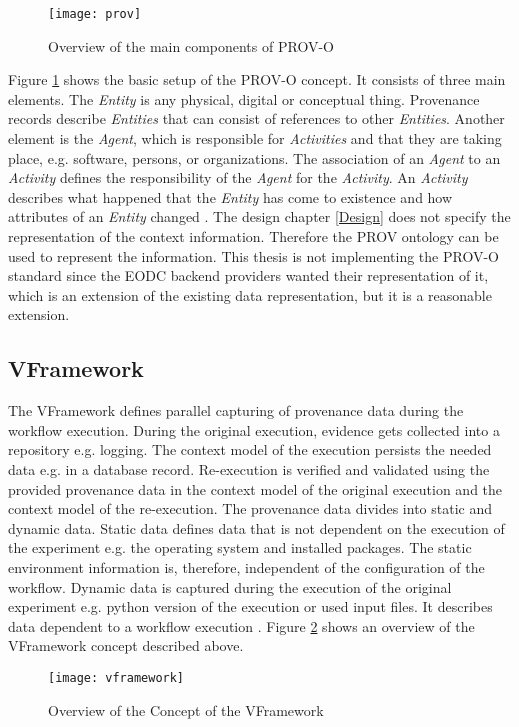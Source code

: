\documentclass[draft,final]{vutinfth} %
\begin{document}
\begin{figure}[h]
	\centering
	\texttt{[image: prov]}
	\caption{Overview of the main components of PROV-O \cite{733f89c65e4844f9aabcae1c276a5602}}
	\label{fig:prov} %
\end{figure}

Figure \ref{fig:prov} shows the basic setup of the PROV-O concept. It consists of three main elements. The \textit{Entity} is any physical, digital or conceptual thing. Provenance records describe \textit{Entities} that can consist of references to other \textit{Entities}. Another element is the \textit{Agent}, which is responsible for \textit{Activities} and that they are taking place, e.g. software, persons, or organizations. The association of an \textit{Agent} to an \textit{Activity} defines the responsibility of the \textit{Agent} for the \textit{Activity}. An \textit{Activity} describes what happened that the \textit{Entity} has come to existence and how attributes of an \textit{Entity} changed \cite{733f89c65e4844f9aabcae1c276a5602}. The design chapter \ref{Design} does not specify the representation of the context information. Therefore the PROV ontology can be used to represent the information. This thesis is not implementing the PROV-O standard since the EODC backend providers wanted their representation of it, which is an extension of the existing data representation, but it is a reasonable extension. 

\subsection{VFramework}\label{vframework}

The VFramework defines parallel capturing of provenance data during the workflow execution. During the original execution, evidence gets collected into a repository e.g. logging. The context model of the execution persists the needed data e.g. in a database record. Re-execution is verified and validated using the provided provenance data in the context model of the original execution and the context model of the re-execution. The provenance data divides into static and dynamic data. Static data defines data that is not dependent on the execution of the experiment e.g. the operating system and installed packages. The static environment information is, therefore, independent of the configuration of the workflow. Dynamic data is captured during the execution of the original experiment e.g. python version of the execution or used input files. It describes data dependent to a workflow execution \cite{Miksa2013FrameworkFV}. 
Figure \ref{fig:vframework} shows an overview of the VFramework concept described above.   
\begin{figure}[h]
	\centering
	\texttt{[image: vframework]}
	\caption{Overview of the Concept of the VFramework \cite{Miksa2013FrameworkFV}}
	\label{fig:vframework} %
\end{figure}
\end{document}

